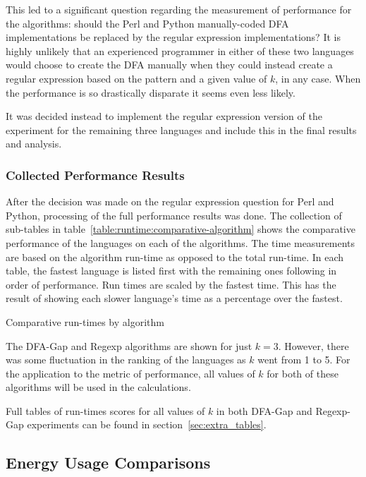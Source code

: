 This led to a significant question regarding the measurement of performance for the algorithms: should the Perl and Python manually-coded DFA implementations be replaced by the regular expression implementations? It is highly unlikely that an experienced programmer in either of these two languages would choose to create the DFA manually when they could instead create a regular expression based on the pattern and a given value of $k$, in any case. When the performance is so drastically disparate it seems even less likely.

It was decided instead to implement the regular expression version of the experiment for the remaining three languages and include this in the final results and analysis.

\subsubsection{Collected Performance Results}

After the decision was made on the regular expression question for Perl and Python, processing of the full performance results was done. The collection of sub-tables in table~\ref{table:runtime:comparative-algorithm} shows the comparative performance of the languages on each of the algorithms. The time measurements are based on the algorithm run-time as opposed to the total run-time. In each table, the fastest language is listed first with the remaining ones following in order of performance. Run times are scaled by the fastest time. This has the result of showing each slower language's time as a percentage over the fastest.

\begin{table}[!htb]

\caption{Comparative run-times by algorithm}
\label{table:runtime:comparative-algorithm}
\end{table}

The DFA-Gap and Regexp algorithms are shown for just $k=3$. However, there was some fluctuation in the ranking of the languages as $k$ went from 1 to 5. For the application to the metric of performance, all values of $k$ for both of these algorithms will be used in the calculations.

Full tables of run-times scores for all values of $k$ in both DFA-Gap and Regexp-Gap experiments can be found in section~\ref{sec:extra_tables}.

\subsection{Energy Usage Comparisons}
\label{subsec:energy_comp}

